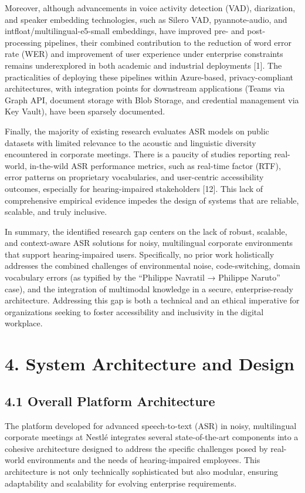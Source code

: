 \documentclass[12pt,a4paper]{article}
\begin{document}
Moreover, although advancements in voice activity detection (VAD), diarization, and speaker embedding technologies, such as Silero VAD, pyannote-audio, and intfloat/multilingual-e5-small embeddings, have improved pre- and post-processing pipelines, their combined contribution to the reduction of word error rate (WER) and improvement of user experience under enterprise constraints remains underexplored in both academic and industrial deployments [1]. The practicalities of deploying these pipelines within Azure-based, privacy-compliant architectures, with integration points for downstream applications (Teams via Graph API, document storage with Blob Storage, and credential management via Key Vault), have been sparsely documented.


Finally, the majority of existing research evaluates ASR models on public datasets with limited relevance to the acoustic and linguistic diversity encountered in corporate meetings. There is a paucity of studies reporting real-world, in-the-wild ASR performance metrics, such as real-time factor (RTF), error patterns on proprietary vocabularies, and user-centric accessibility outcomes, especially for hearing-impaired stakeholders [12]. This lack of comprehensive empirical evidence impedes the design of systems that are reliable, scalable, and truly inclusive.


In summary, the identified research gap centers on the lack of robust, scalable, and context-aware ASR solutions for noisy, multilingual corporate environments that support hearing-impaired users. Specifically, no prior work holistically addresses the combined challenges of environmental noise, code-switching, domain vocabulary errors (as typified by the “Philippe Navratil → Philippe Naruto” case), and the integration of multimodal knowledge in a secure, enterprise-ready architecture. Addressing this gap is both a technical and an ethical imperative for organizations seeking to foster accessibility and inclusivity in the digital workplace.


\section{4. System Architecture and Design}


\subsection{4.1 Overall Platform Architecture}


The platform developed for advanced speech-to-text (ASR) in noisy, multilingual corporate meetings at Nestlé integrates several state-of-the-art components into a cohesive architecture designed to address the specific challenges posed by real-world environments and the needs of hearing-impaired employees. This architecture is not only technically sophisticated but also modular, ensuring adaptability and scalability for evolving enterprise requirements.
\end{document}
